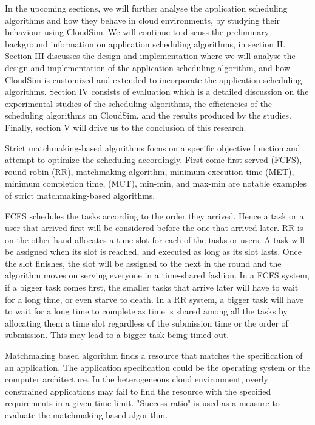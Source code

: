 \documentclass[times, 10pt,twocolumn]{article}
\begin{document}
In the upcoming sections, we will further analyse the application scheduling algorithms and how they behave in cloud environments, by studying their behaviour using CloudSim. We will continue to discuss the preliminary background information on application scheduling algorithms, in section II. Section III discusses the design and implementation where we will analyse the design and implementation of the application scheduling algorithm, and how CloudSim is customized and extended to incorporate the application scheduling algorithms. Section IV consists of evaluation which is a detailed discussion on the experimental studies of the scheduling algorithms, the efficiencies of the scheduling algorithms on CloudSim, and the results produced by the studies. Finally, section V will drive us to the conclusion of this research.

Strict matchmaking-based algorithms focus on a specific objective function and attempt to optimize the scheduling accordingly. First-come first-served (FCFS), round-robin (RR), matchmaking algorithm, minimum execution time (MET), minimum completion time, (MCT), min-min, and max-min\cite{heuristics} are notable examples of strict matchmaking-based algorithms. 

FCFS schedules the tasks according to the order they arrived. Hence a task or a user that arrived first will be considered before the one that arrived later. RR is on the other hand allocates a time slot for each of the tasks or users. A task will be assigned when its slot is reached, and executed as long as its slot lasts. Once the slot finishes, the slot will be assigned to the next in the round and the algorithm moves on serving everyone in a time-shared fashion. In a FCFS system, if a bigger task comes first, the smaller tasks that arrive later will have to wait for a long time, or even starve to death. In a RR system, a bigger task will have to wait for a long time to complete as time is shared among all the tasks by allocating them a time slot regardless of the submission time or the order of submission. This may lead to a bigger task being timed out.

Matchmaking based algorithm finds a resource that matches the specification of an application. The application specification could be the operating system or the computer architecture. In the heterogeneous cloud environment, overly constrained applications may fail to find the resource with the specified requirements in a given time limit. "Success ratio" is used as a measure to evaluate the matchmaking-based algorithm. 
\end{document}
